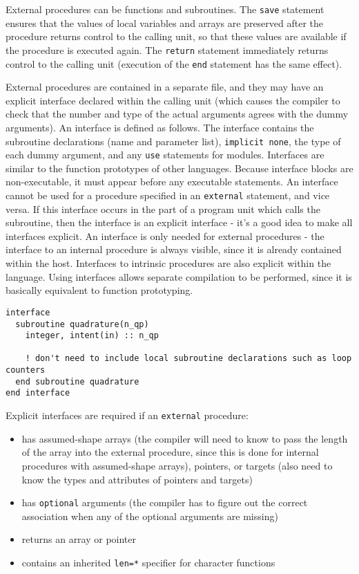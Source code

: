 \documentclass[10pt]{article}
\begin{document}
External procedures can be functions and subroutines. The {\tt save} statement ensures that the values of local variables and arrays are preserved after the procedure returns control to the calling unit, so that these values are available if the procedure is executed again. The {\tt return} statement immediately returns control to the calling unit (execution of the {\tt end} statement has the same effect). 

External procedures are contained in a separate file, and they may have an explicit interface declared within the calling unit (which causes the compiler to check that the number and type of the actual arguments agrees with the dummy arguments). An interface is defined as follows. The interface contains the subroutine declarations (name and parameter list), {\tt implicit none}, the type of each dummy argument, and any {\tt use} statements for modules. Interfaces are similar to the function prototypes of other languages. Because interface blocks are non-executable, it must appear before any executable statements. An interface cannot be used for a procedure specified in an {\tt external} statement, and vice versa. If this interface occurs in the part of a program unit which calls the subroutine, then the interface is an explicit interface - it's a good idea to make all interfaces explicit. An interface is only needed for external procedures - the interface to an internal procedure is always visible, since it is already contained within the host. Interfaces to intrinsic procedures are also explicit within the language. Using interfaces allows separate compilation to be performed, since it is basically equivalent to function prototyping. 

\begin{lstlisting}
interface
  subroutine quadrature(n_qp)
    integer, intent(in) :: n_qp
    
    ! don't need to include local subroutine declarations such as loop counters
  end subroutine quadrature
end interface
\end{lstlisting}

Explicit interfaces are required if an {\tt external} procedure:

\begin{itemize}
\item has assumed-shape arrays (the compiler will need to know to pass the length of the array into the external procedure, since this is done for internal procedures with assumed-shape arrays), pointers, or targets (also need to know the types and attributes of pointers and targets)
\item has {\tt optional} arguments (the compiler has to figure out the correct association when any of the optional arguments are missing)
\item returns an array or pointer
\item contains an inherited {\tt len=*} specifier for character functions
\end{itemize}
\end{document}
